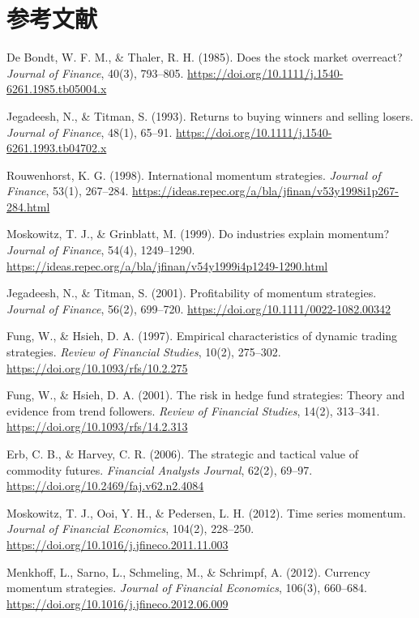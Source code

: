 \documentclass[11pt,a4paper]{article}
\begin{document}
\section*{参考文献}
\begin{enumerate}[label={[\arabic*]},itemsep=2pt]
\sloppy
\item De Bondt, W. F. M., \& Thaler, R. H. (1985). Does the stock market overreact? \emph{Journal of Finance}, 40(3), 793--805. \url{https://doi.org/10.1111/j.1540-6261.1985.tb05004.x}
\item Jegadeesh, N., \& Titman, S. (1993). Returns to buying winners and selling losers. \emph{Journal of Finance}, 48(1), 65--91. \url{https://doi.org/10.1111/j.1540-6261.1993.tb04702.x}
\item Rouwenhorst, K. G. (1998). International momentum strategies. \emph{Journal of Finance}, 53(1), 267--284. \url{https://ideas.repec.org/a/bla/jfinan/v53y1998i1p267-284.html}
\item Moskowitz, T. J., \& Grinblatt, M. (1999). Do industries explain momentum? \emph{Journal of Finance}, 54(4), 1249--1290. \url{https://ideas.repec.org/a/bla/jfinan/v54y1999i4p1249-1290.html}
\item Jegadeesh, N., \& Titman, S. (2001). Profitability of momentum strategies. \emph{Journal of Finance}, 56(2), 699--720. \url{https://doi.org/10.1111/0022-1082.00342}
\item Fung, W., \& Hsieh, D. A. (1997). Empirical characteristics of dynamic trading strategies. \emph{Review of Financial Studies}, 10(2), 275--302. \url{https://doi.org/10.1093/rfs/10.2.275}
\item Fung, W., \& Hsieh, D. A. (2001). The risk in hedge fund strategies: Theory and evidence from trend followers. \emph{Review of Financial Studies}, 14(2), 313--341. \url{https://doi.org/10.1093/rfs/14.2.313}
\item Erb, C. B., \& Harvey, C. R. (2006). The strategic and tactical value of commodity futures. \emph{Financial Analysts Journal}, 62(2), 69--97. \url{https://doi.org/10.2469/faj.v62.n2.4084}
\item Moskowitz, T. J., Ooi, Y. H., \& Pedersen, L. H. (2012). Time series momentum. \emph{Journal of Financial Economics}, 104(2), 228--250. \url{https://doi.org/10.1016/j.jfineco.2011.11.003}
\item Menkhoff, L., Sarno, L., Schmeling, M., \& Schrimpf, A. (2012). Currency momentum strategies. \emph{Journal of Financial Economics}, 106(3), 660--684. \url{https://doi.org/10.1016/j.jfineco.2012.06.009}

\end{enumerate}
\end{document}
